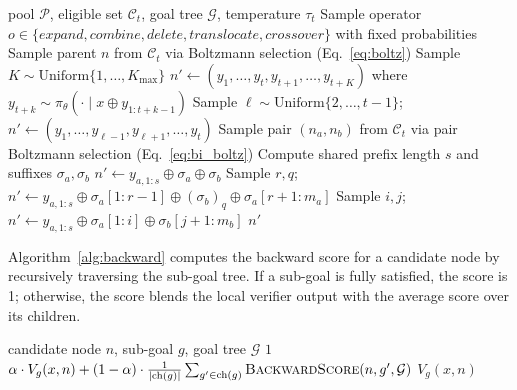 \begin{algorithm}[h]
\caption{\textsc{ForwardStep}: Forward Search Step}
\label{alg:forward}
\begin{algorithmic}[1]
\Require pool $\mathcal{P}$, eligible set $\mathcal{C}_t$, goal tree $\mathcal{G}$, temperature $\tau_t$
\State Sample operator $o \in \{\textit{expand}, \textit{combine}, \textit{delete}, \textit{translocate}, \textit{crossover}\}$ with fixed probabilities
 
    \State Sample parent $n$ from $\mathcal{C}_t$ via Boltzmann selection (Eq.~\ref{eq:boltz})
        \State Sample $K \sim \mathrm{Uniform}\{1, \ldots, K_{\max}\}$
        \State $n' \leftarrow (y_1, \ldots, y_t, y_{t+1}, \ldots, y_{t+K})$ where $y_{t+k} \sim \pi_\theta(\cdot \mid x \oplus y_{1:t+k-1})$
    \Else
        \State Sample $\ell \sim \mathrm{Uniform}\{2, \ldots, t-1\}$; \, $n' \leftarrow (y_1, \ldots, y_{\ell-1}, y_{\ell+1}, \ldots, y_t)$
    \EndIf
\Else {}
    \State Sample pair $(n_a, n_b)$ from $\mathcal{C}_t$ via pair Boltzmann selection (Eq.~\ref{eq:bi_boltz})
    \State Compute shared prefix length $s$ and suffixes $\sigma_a, \sigma_b$
        \State $n' \leftarrow y_{a,1:s} \oplus \sigma_a \oplus \sigma_b$
        \State Sample $r, q$; \, $n' \leftarrow y_{a,1:s} \oplus \sigma_a[1:r\!-\!1] \oplus (\sigma_b)_q \oplus \sigma_a[r\!+\!1:m_a]$
        \State Sample $i, j$; \, $n' \leftarrow y_{a,1:s} \oplus \sigma_a[1:i] \oplus \sigma_b[j\!+\!1:m_b]$
    \EndIf
\EndIf
\State \Return $n'$
\end{algorithmic}
\end{algorithm}

Algorithm~\ref{alg:backward} computes the backward score for a candidate node by recursively traversing the sub-goal tree. If a sub-goal is fully satisfied, the score is 1; otherwise, the score blends the local verifier output with the average score over its children.

\begin{algorithm}[h]
\caption{\textsc{BackwardScore}: Backward Search Scoring}
\label{alg:backward}
\begin{algorithmic}[1]
\Require candidate node $n$, sub-goal $g$, goal tree $\mathcal{G}$
    \State \Return $1$
    \State \Return $\alpha \cdot V_g(x, n) + (1 - \alpha) \cdot \frac{1}{|\mathrm{ch}(g)|} \sum_{g' \in \mathrm{ch}(g)} \textsc{BackwardScore}(n, g', \mathcal{G})$
\Else
    \State \Return $V_g(x, n)$
\EndIf
\end{algorithmic}
\end{algorithm}

